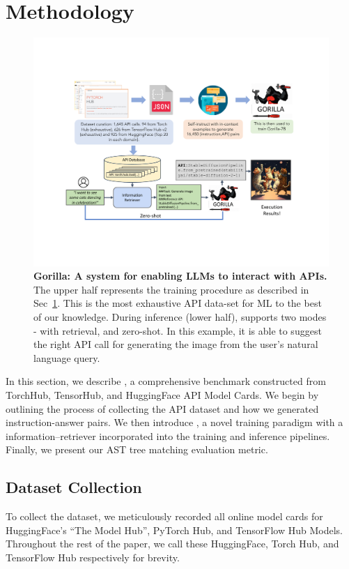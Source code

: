 \section{Methodology}
\label{sec:method}

\begin{figure}[t]
    \includegraphics[width=\linewidth]{figures/llmapi.pdf}
\caption{\footnotesize \textbf{Gorilla: A system for enabling LLMs to interact with APIs.} The upper half represents the training procedure as described in Sec~\ref{sec:method}. This is the most exhaustive API data-set for ML to the best of our knowledge. During inference (lower half), \gorilla{} supports two modes - with retrieval, and zero-shot. In this example, it is able to suggest the right API call for generating the image from the user's natural language query.}
\label{fig:gorilla}
\end{figure}


In this section, we describe \oursdataset{}, a comprehensive benchmark constructed from TorchHub, TensorHub, and HuggingFace API Model Cards. We begin by outlining the process of collecting the API dataset and how we generated instruction-answer pairs. We then introduce \oursmethod{}, a novel training paradigm with a  information\---retriever incorporated into the training and inference pipelines. Finally, we present our AST tree matching evaluation metric.



\subsection{Dataset Collection}
To collect the dataset, we meticulously recorded all online model cards for HuggingFace's ``The Model Hub'', PyTorch Hub, and TensorFlow Hub Models. Throughout the rest of the paper, we call these HuggingFace, Torch Hub, and TensorFlow Hub respectively for brevity. 

